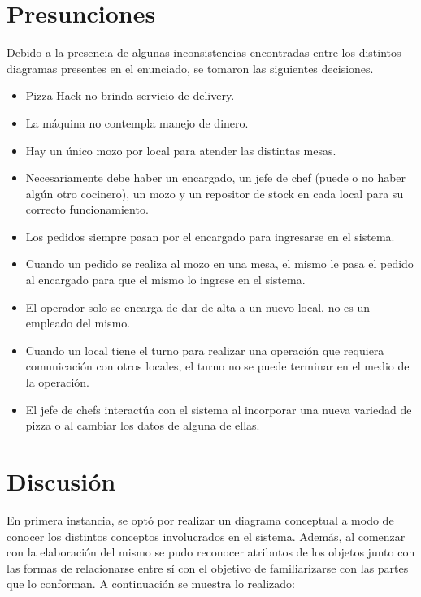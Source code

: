 \documentclass[a4paper,11pt] {article}
\begin{document}
\section*{Presunciones}

Debido a la presencia de algunas inconsistencias encontradas entre los distintos diagramas presentes en el enunciado, se tomaron las siguientes decisiones.

\begin{itemize}
    \item Pizza Hack no brinda servicio de delivery.
    \item La m\'aquina no contempla manejo de dinero.
    \item Hay un \'unico mozo por local para atender las distintas mesas.
    \item Necesariamente debe haber un encargado, un jefe de chef (puede o no haber alg\'un otro cocinero), un mozo y un repositor de stock en cada local para su correcto funcionamiento.
    \item Los pedidos siempre pasan por el encargado para ingresarse en el sistema.
    \item Cuando un pedido se realiza al mozo en una mesa, el mismo le pasa el pedido al encargado para que el mismo lo ingrese en el sistema.
    \item El operador solo se encarga de dar de alta a un nuevo local, no es un empleado del mismo.
    \item Cuando un local tiene el turno para realizar una operaci\'on que requiera comunicaci\'on con otros locales, el turno no se puede terminar en el medio de la operaci\'on.
    \item El jefe de chefs interactúa con el sistema al incorporar una nueva variedad de pizza o al cambiar los datos de alguna de ellas.
\end{itemize}

\section*{Discusi\'on}

En primera instancia, se opt\'o por realizar un diagrama conceptual a modo de conocer los distintos conceptos involucrados en el sistema. Adem\'as, al comenzar con la elaboraci\'on del mismo se pudo reconocer atributos de los objetos junto con las formas de relacionarse entre s\'i con el objetivo de familiarizarse con las partes que lo conforman. A continuaci\'on se muestra lo realizado:
\end{document}
